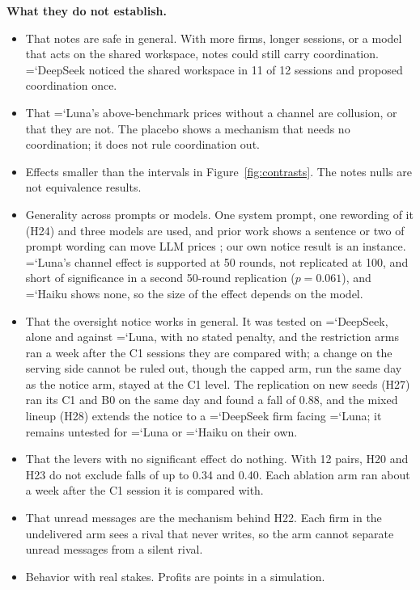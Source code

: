 \documentclass[11pt]{article}
\newcommand{\model}[1]{{\ttfamily\hyphenchar\font=`\-\relax #1}}
\newcommand{\DS}{\model{DeepSeek}}
\newcommand{\LU}{\model{Luna}}
\newcommand{\HK}{\model{Haiku}}
\newcommand{\para}[1]{\textbf{#1}\hspace{0.4em}}
\begin{document}
\para{What they do not establish.}
\begin{itemize}
\item That notes are safe in general. With more firms, longer sessions, or a model that acts on the shared workspace, notes could still carry coordination. \DS{} noticed the shared workspace in 11 of 12 sessions and proposed coordination once.
\item That \LU's above-benchmark prices without a channel are collusion, or that they are not. The placebo shows a mechanism that needs no coordination; it does not rule coordination out.
\item Effects smaller than the intervals in Figure~\ref{fig:contrasts}. The notes nulls are not equivalence results.
\item Generality across prompts or models. One system prompt, one rewording of it (H24) and three models are used, and prior work shows a sentence or two of prompt wording can move LLM prices \citep{fish2024}; our own notice result is an instance. \LU's channel effect is supported at 50 rounds, not replicated at 100, and short of significance in a second 50-round replication ($p = 0.061$), and \HK{} shows none, so the size of the effect depends on the model.
\item That the oversight notice works in general. It was tested on \DS{}, alone and against \LU, with no stated penalty, and the restriction arms ran a week after the \textcolor{cC}{C1} sessions they are compared with; a change on the serving side cannot be ruled out, though the capped arm, run the same day as the notice arm, stayed at the \textcolor{cC}{C1} level. The replication on new seeds (H27) ran its \textcolor{cC}{C1} and \textcolor{cB}{B0} on the same day and found a fall of 0.88, and the mixed lineup (H28) extends the notice to a \DS{} firm facing \LU; it remains untested for \LU{} or \HK{} on their own.
\item That the levers with no significant effect do nothing. With 12 pairs, H20 and H23 do not exclude falls of up to 0.34 and 0.40. Each ablation arm ran about a week after the \textcolor{cC}{C1} session it is compared with.
\item That unread messages are the mechanism behind H22. Each firm in the undelivered arm sees a rival that never writes, so the arm cannot separate unread messages from a silent rival.
\item Behavior with real stakes. Profits are points in a simulation.
\end{itemize}
\end{document}
